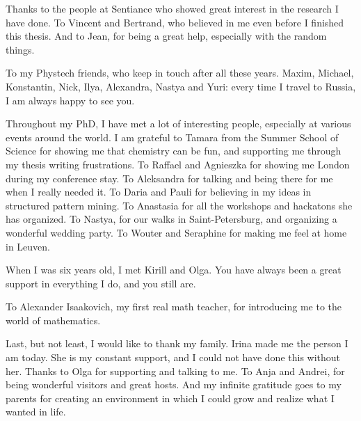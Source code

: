 Thanks to the people at Sentiance who showed great interest in the research I have done. To Vincent and Bertrand, who believed in me even before I finished this thesis. And to Jean, for being a great help, especially with the random things.

To my Phystech friends, who keep in touch after all these years. Maxim, Michael, Konstantin, Nick, Ilya, Alexandra, Nastya and Yuri: every time I travel to Russia, I am always happy to see you.

Throughout my PhD, I have met a lot of interesting people, especially at various events around the world. I am grateful to Tamara from the Summer School of Science for showing me that chemistry can be fun, and supporting me through my thesis writing frustrations. To Raffael and Agnieszka for showing me London during my conference stay. To Aleksandra for talking and being there for me when I really needed it. To Daria and Pauli for believing in my ideas in structured pattern mining. To Anastasia for all the workshops and hackatons she has organized. To Nastya, for our walks in Saint-Petersburg, and organizing a wonderful wedding party. To Wouter and Seraphine for making me feel at home in Leuven.

When I was six years old, I met Kirill and Olga. You have always been a great support in everything I do, and you still are.

To Alexander Isaakovich, my first real math teacher, for introducing me to the world of mathematics.

Last, but not least, I would like to thank my family. Irina made me the person I am today. She is my constant support, and I could not have done this without her. Thanks to Olga for supporting and talking to me. To Anja and Andrei, for being wonderful visitors and great hosts. And my infinite gratitude goes to my parents for creating an environment in which I could grow and realize what I wanted in life.

